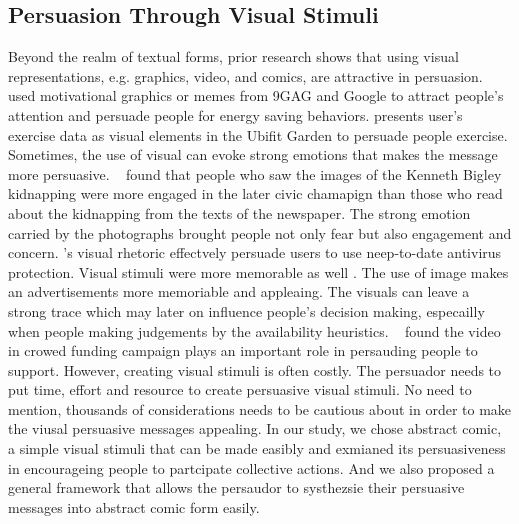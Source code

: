 \subsection{Persuasion Through Visual Stimuli}
Beyond the realm of textual forms, prior research shows that using visual representations, e.g. graphics, video, and comics, are attractive in persuasion. ~\textcite{selker2015sweetbuildinggreeter} used motivational graphics or memes from 9GAG and Google to attract people's attention and persuade people for energy saving behaviors. \textcite{consolvo2008activity} presents user's exercise data as visual elements in the Ubifit Garden to persuade people exercise. Sometimes, the use of visual can evoke strong emotions that makes the message more persuasive. ~\textcite{iyer2006picture} found that people who saw the images of the Kenneth Bigley kidnapping were more engaged in the later civic chamapign than those who read about the kidnapping from the texts of the newspaper. The strong emotion carried by the photographs brought people not only fear but also engagement and concern. \textcite{}'s visual rhetoric effectvely persuade users to use neep-to-date antivirus protection. Visual stimuli were more memorable as well \cite{rossandniestt1980}. The use of image makes an advertisements more memoriable and appleaing. The visuals can leave a strong trace which may later on influence people's decision making, especailly when people making judgements by the availability heuristics. ~\textcite{sanortia} found the video in crowed funding campaign plays an important role in persauding people to support. However, creating visual stimuli is often costly. The persuador needs to put time, effort and resource to create persuasive visual stimuli. No need to mention, thousands of considerations needs to be cautious about in order to make the viusal persuasive messages appealing. In our study, we chose abstract comic, a simple visual stimuli that can be made easibly and exmianed its persuasiveness in encourageing people to partcipate collective actions. And we also proposed a general framework that allows the persaudor to systhezsie their persuasive messages into abstract comic form easily. 


